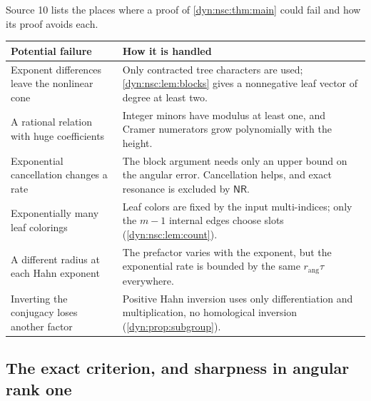 \documentclass[11pt,letterpaper]{article}
\theoremstyle{definition}
\theoremstyle{remark}
\newcommand{\nres}{\mathsf{NR}}
\newcommand{\rang}{r_{\mathrm{ang}}}
\numberwithin{equation}{section}
\begin{document}
Source 10 lists the places where a proof of \cref{dyn:nsc:thm:main} could
fail and how its proof avoids each.
\begin{center}
\begin{tabular}{@{}P{0.28\textwidth}P{0.64\textwidth}@{}}
\toprule
Potential failure & How it is handled\\
\midrule
Exponent differences leave the nonlinear cone & Only contracted tree
characters are used; \cref{dyn:nsc:lem:blocks} gives a nonnegative leaf
vector of degree at least two.\\[3pt]
A rational relation with huge coefficients & Integer minors have modulus
at least one, and Cramer numerators grow polynomially with the height.\\[3pt]
Exponential cancellation changes a rate & The block argument needs only an
upper bound on the angular error. Cancellation helps, and exact resonance is
excluded by $\nres$.\\[3pt]
Exponentially many leaf colorings & Leaf colors are fixed by the input
multi-indices; only the $m-1$ internal edges choose slots
(\cref{dyn:nsc:lem:count}).\\[3pt]
A different radius at each Hahn exponent & The prefactor varies with the
exponent, but the exponential rate is bounded by the same $\rang\tau$
everywhere.\\[3pt]
Inverting the conjugacy loses another factor & Positive Hahn inversion
uses only differentiation and multiplication, no homological inversion
(\cref{dyn:prop:subgroup}).\\
\bottomrule
\end{tabular}
\end{center}

\subsection{The exact criterion, and sharpness in angular rank one}
\label{dyn:nsc:subsec:sharp}
\end{document}
